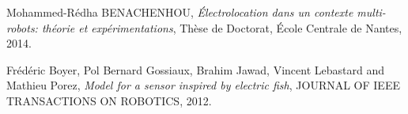 \documentclass[11pt,a4paper,french]{article}
\begin{document}
\begin{thebibliography}{99}
 Mohammed-Rédha BENACHENHOU, \emph{Électrolocation dans un contexte multi-robots: théorie et expérimentations}, Thèse de Doctorat, École Centrale de Nantes, 2014. 

 Frédéric Boyer, Pol Bernard Gossiaux, Brahim Jawad, Vincent Lebastard and Mathieu Porez, \emph{Model for a sensor inspired by electric fish}, JOURNAL OF IEEE TRANSACTIONS ON ROBOTICS, 2012.

 
\end{thebibliography}
\IMTAcoverpage
\end{document}
